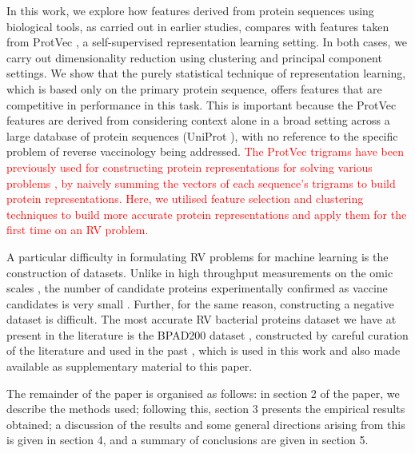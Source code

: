 \documentclass[10pt,journal,compsoc,twoside]{IEEEtran}
\begin{document}
In this work, we explore how features derived from protein sequences using biological tools, as carried out in earlier studies, compares with features taken from ProtVec \cite{protvec}, a self-supervised representation learning setting. In both cases, we carry out dimensionality reduction using clustering and principal component settings. We show that the purely statistical technique of representation learning, which is based only on the primary protein sequence, offers features that are competitive in performance in this task. This is important because the ProtVec features are derived from considering context alone in a broad setting across a large database of protein sequences (UniProt \cite{uniprot_2018}), with no reference to the specific problem of reverse vaccinology being addressed. \textcolor{red}{The ProtVec trigrams have been previously used for constructing protein representations for solving various problems \cite{PhosContext2vec,prot_embeddings_re-used_ml}, by naively summing the vectors of each sequence's trigrams to build protein representations. Here, we utilised feature selection and clustering techniques to build more accurate protein representations and apply them for the first time on an RV problem.}
	
A particular difficulty in formulating RV problems for machine learning is the construction of datasets. Unlike in high throughput measurements on the omic scales \cite{haussler-pnas-paper,spellman}, the number of candidate proteins experimentally confirmed as vaccine candidates is very small \cite{dalsass_2019}. Further, for the same reason, constructing a negative dataset is difficult. The most accurate RV bacterial proteins dataset we have at present in the literature is the BPAD200 dataset \cite{heinson_2017}, constructed by careful curation of the literature and used in the past \cite{heinson_2017,heinson_2019,dalsass_2019}, which is used in this work and also made available as supplementary material to this paper. 

The remainder of the paper is organised as follows: in section 2 of the paper, we describe the methods used; following this, section 3 presents the empirical results obtained; a discussion of the results and some general directions arising from this is given in section 4, and a summary of conclusions are given in section 5.


\end{document}
